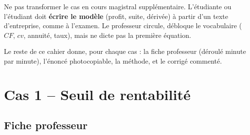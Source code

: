 \documentclass[12pt,a4paper]{article}
\begin{document}
\begin{attentionbox}
Ne pas transformer le cas en cours magistral supplémentaire. L'étudiante ou l'étudiant doit \textbf{écrire le modèle} (profit, suite, dérivée) à partir d'un texte d'entreprise, comme à l'examen. Le professeur circule, débloque le vocabulaire ($CF$, $cv$, annuité, taux), mais ne dicte pas la première équation.
\end{attentionbox}

Le reste de ce cahier donne, pour chaque cas : la fiche professeur (déroulé minute par minute), l'énoncé photocopiable, la méthode, et le corrigé commenté.

\section{Cas 1 -- Seuil de rentabilité}

\subsection{Fiche professeur}
\end{document}
